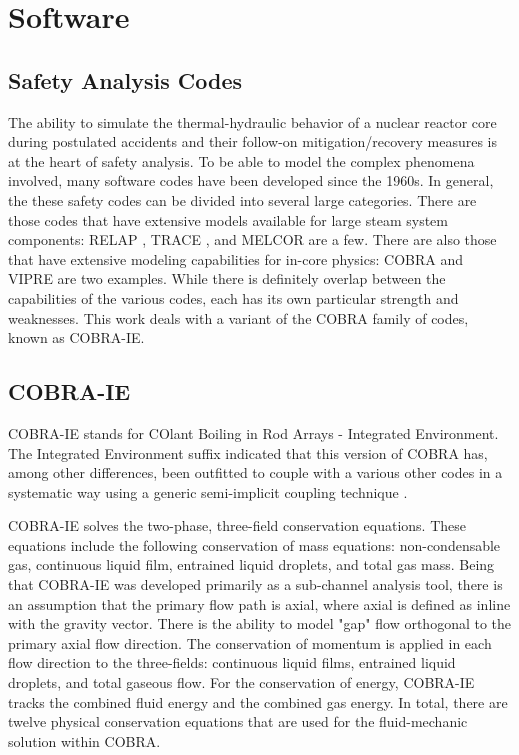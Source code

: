 \chapter{Software}

\section{Safety Analysis Codes}
The ability to simulate the thermal-hydraulic behavior of a nuclear reactor core during postulated accidents and their follow-on mitigation/recovery measures is at the heart of safety analysis.
To be able to model the complex phenomena involved, many software codes have been developed since the 1960s.
In general, the these safety codes can be divided into several large categories. There are those codes that have extensive models available for large steam system components: RELAP \cite{RELAP}, TRACE \cite{TRACE}, and MELCOR are a few.
There are also those that have extensive modeling capabilities for in-core physics: COBRA \cite{Thurgood1983c} and VIPRE are two examples.
While there is definitely overlap between the capabilities of the various codes, each has its own particular strength and weaknesses.
This work deals with a variant of the COBRA family of codes, known as COBRA-IE.

\section{COBRA-IE}
COBRA-IE stands for COlant Boiling in Rod Arrays - Integrated Environment.
The Integrated Environment suffix indicated that this version of COBRA has, among other differences, been outfitted to couple with a various other codes in a systematic way using a generic semi-implicit coupling technique \cite{Weaver2002}.

COBRA-IE solves the two-phase, three-field conservation equations.
These equations include the following conservation of mass equations: non-condensable gas, continuous liquid film, entrained liquid droplets, and total gas mass.
Being that COBRA-IE was developed primarily as a sub-channel analysis tool, there is an assumption that the primary flow path is axial, where axial is defined as inline with the gravity vector.
There is the ability to model "gap" flow orthogonal to the primary axial flow direction.
The conservation of momentum is applied in each flow direction to the three-fields: continuous liquid films, entrained liquid droplets, and total gaseous flow.
For the conservation of energy, COBRA-IE tracks the combined fluid energy and the combined gas energy.
In total, there are twelve physical conservation equations that are used for the fluid-mechanic solution within COBRA.

